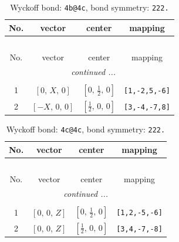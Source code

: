 \documentclass[fleqn,8pt]{jsarticle}
\begin{document}
\renewcommand{\arraystretch}{1.2}
\begin{longtable}{cccc}
\caption{Wyckoff bond: {\tt 4b@4c}, bond symmetry: {\tt 222.}}
 \\
 \hline \hline
No. & vector & center & mapping \\ \hline \endfirsthead

\multicolumn{3}{l}{\tablename\ \thetable{}} \\
 \hline \hline
No. & vector & center & mapping \\ \hline \endhead

 \hline \hline
\multicolumn{3}{r}{\footnotesize\it continued ...} \\ \endfoot

 \hline \hline
\multicolumn{3}{r}{} \\ \endlastfoot

1 & $\left[ 0,\, X,\, 0 \right]$ & $\left[ 0,\, \frac{1}{2},\, 0 \right]$ & {\tt [1,-2,5,-6]} \\ \hline
2 & $\left[ - X,\, 0,\, 0 \right]$ & $\left[ \frac{1}{2},\, 0,\, 0 \right]$ & {\tt [3,-4,-7,8]} \\
\end{longtable}
\renewcommand{\arraystretch}{1.2}
\begin{longtable}{cccc}
\caption{Wyckoff bond: {\tt 4c@4c}, bond symmetry: {\tt 222.}}
 \\
 \hline \hline
No. & vector & center & mapping \\ \hline \endfirsthead

\multicolumn{3}{l}{\tablename\ \thetable{}} \\
 \hline \hline
No. & vector & center & mapping \\ \hline \endhead

 \hline \hline
\multicolumn{3}{r}{\footnotesize\it continued ...} \\ \endfoot

 \hline \hline
\multicolumn{3}{r}{} \\ \endlastfoot

1 & $\left[ 0,\, 0,\, Z \right]$ & $\left[ 0,\, \frac{1}{2},\, 0 \right]$ & {\tt [1,2,-5,-6]} \\ \hline
2 & $\left[ 0,\, 0,\, Z \right]$ & $\left[ \frac{1}{2},\, 0,\, 0 \right]$ & {\tt [3,4,-7,-8]} \\
\end{longtable}
\renewcommand{\arraystretch}{1.2}
\end{document}
